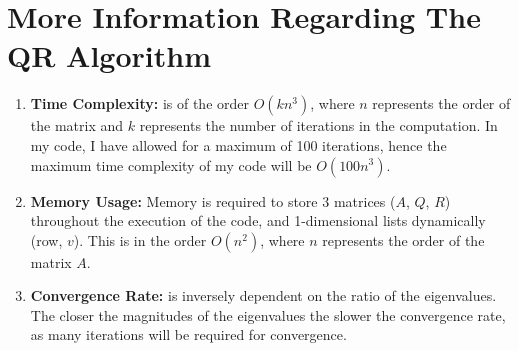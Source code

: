 \documentclass[journal,12pt,twocolumn]{IEEEtran}
\theoremstyle{remark}
\begin{document}
\section*{More Information Regarding The QR Algorithm}
\begin{enumerate}
	\item \textbf{Time Complexity:} is of the order $O(kn^3)$, where $n$ represents the order of the matrix and $k$ represents the number of iterations in the computation. In my code, I have allowed for a maximum of 100 iterations, hence the maximum time complexity of my code will be $O(100n^3)$.
	\item \textbf{Memory Usage:} Memory is required to store 3 matrices ($A$, $Q$, $R$) throughout the execution of the code, and 1-dimensional lists dynamically (row, $v$). This is in the order $O(n^2)$, where $n$ represents the order of the matrix $A$.
	\item \textbf{Convergence Rate:} is inversely dependent on the ratio of the eigenvalues. The closer the magnitudes of the eigenvalues the slower the convergence rate, as many iterations will be required for convergence.
\end{enumerate}
\end{document}
